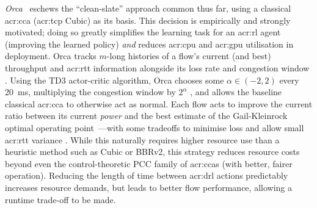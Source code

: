 \emph{Orca}~\parencite{DBLP:conf/sigcomm/AbbaslooYC20} eschews the ``clean-slate'' approach common thus far, using a classical \gls{acr:cca} (\gls{acr:tcp} Cubic) as its basis.
This decision is empirically and strongly motivated; doing so greatly simplifies the learning task for an \gls{acr:rl} agent (improving the learned policy) \emph{and} reduces \gls{acr:cpu} and \gls{acr:gpu} utilisation in deployment.
Orca tracks $m$-long histories of a flow's current (and best) throughput and \gls{acr:rtt} information alongside its loss rate and congestion window \prllitstate.
Using the TD3 actor-critic algorithm, Orca chooses some $\alpha\in\left(-2, 2\right)$ every \qty{20}{\milli\second}, multiplying the congestion window by $2^\alpha$ \prllitactreal, and allows the baseline classical \gls{acr:cca} to otherwise act as normal.
Each flow acts to improve the current ratio between its current \emph{power} and the best estimate of the Gail-Kleinrock optimal operating point~\parencite{KleinrockPoint1,KleinrockPoint2}---with some tradeoffs to minimise loss and allow small \gls{acr:rtt} variance \prllitreward.
While this naturally requires higher resource use than a heuristic method such as Cubic or BBRv2, this strategy reduces resource costs beyond even the control-theoretic PCC family of \glspl{acr:cca} (with better, fairer operation).
Reducing the length of time between \gls{acr:drl} actions predictably increases resource demands, but leads to better flow performance, allowing a runtime trade-off to be made.

